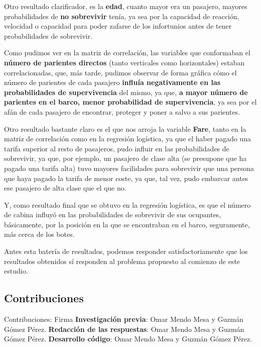 \documentclass[]{article}
\begin{document}
Otro resultado clarificador, es la \textbf{edad}, cuanto mayor era un
pasajero, mayores probabilidades de \textbf{no sobrevivir} tenía, ya sea
por la capacidad de reacción, velocidad o capacidad para poder zafarse
de los infortunios antes de tener probabilidades de sobrevivir.

Como pudimos ver en la matriz de correlación, las variables que
conformaban el \textbf{número de parientes directos} (tanto verticales
como horizontales) estaban correlacionadas, que, más tarde, pudimos
observar de forma gráfica cómo el número de parientes de cada pasajero
\textbf{influía negativamente en las probabilidades de supervivencia}
del mismo, ya que, \textbf{a mayor número de parientes en el barco,
menor probabilidad de supervivencia}, ya sea por el afán de cada
pasajero de encontrar, proteger y poner a salvo a sus parientes.

Otro resultado bastante claro es el que nos arroja la variable
\textbf{Fare}, tanto en la matriz de correlación como en la regresión
logística, ya que el haber pagado una tarifa superior al resto de
pasajeros, pudo influir en las probabilidades de sobrevivir, ya que, por
ejemplo, un pasajero de clase alta (se presupone que ha pagado una
tarifa alta) tuvo mayores facilidades para sobrevivir que una persona
que haya pagado la tarifa de menor coste, ya que, tal vez, pudo embarcar
antes ese pasajero de alta clase que el que no.

Y, como resultado final que se obtuvo en la regresión logística, es que
el número de cabina influyó en las probabilidades de sobrevivir de sus
ocupantes, básicamente, por la posición en la que se encontraban en el
barco, seguramente, más cerca de los botes.

Antes esta batería de resultados, podemos responder satisfactoriamente
que los resultados obtenidos sí responden al problema propuesto al
comienzo de este estudio.

\hypertarget{contribuciones}{%
\subsection{Contribuciones}\label{contribuciones}}

Contribuciones: Firma \textbf{Investigación previa}: Omar Mendo Mesa y
Guzmán Gómez Pérez. \textbf{Redacción de las respuestas}: Omar Mendo
Mesa y Guzmán Gómez Pérez. \textbf{Desarrollo código}: Omar Mendo Mesa y
Guzmán Gómez Pérez.
\end{document}
